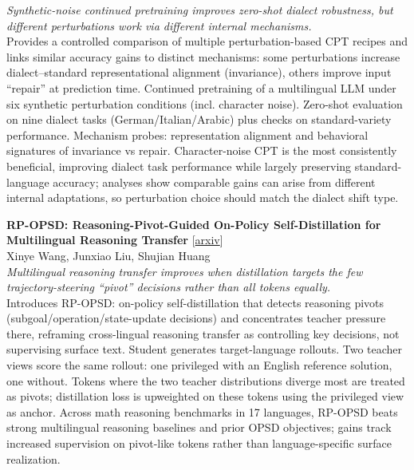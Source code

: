 \documentclass[12pt,letterpaper]{article}
\begin{document}
{\small\textit{Synthetic-noise continued pretraining improves zero-shot dialect robustness, but different perturbations work via different internal mechanisms.}}\\[1pt]
{\footnotesize Provides a controlled comparison of multiple perturbation-based CPT recipes and links similar accuracy gains to distinct mechanisms: some perturbations increase dialect--standard representational alignment (invariance), others improve input ``repair'' at prediction time. Continued pretraining of a multilingual LLM under six synthetic perturbation conditions (incl. character noise). Zero-shot evaluation on nine dialect tasks (German/Italian/Arabic) plus checks on standard-variety performance. Mechanism probes: representation alignment and behavioral signatures of invariance vs repair. Character-noise CPT is the most consistently beneficial, improving dialect task performance while largely preserving standard-language accuracy; analyses show comparable gains can arise from different internal adaptations, so perturbation choice should match the dialect shift type.}

\medskip

{\small\textbf{RP-OPSD: Reasoning-Pivot-Guided On-Policy Self-Distillation for Multilingual Reasoning Transfer}} {\scriptsize[\href{https://arxiv.org/abs/2608.06347}{arxiv}]}\\
{\scriptsize Xinye Wang, Junxiao Liu, Shujian Huang}\\

{\small\textit{Multilingual reasoning transfer improves when distillation targets the few trajectory-steering ``pivot'' decisions rather than all tokens equally.}}\\[1pt]
{\footnotesize Introduces RP-OPSD: on-policy self-distillation that detects reasoning pivots (subgoal/operation/state-update decisions) and concentrates teacher pressure there, reframing cross-lingual reasoning transfer as controlling key decisions, not supervising surface text. Student generates target-language rollouts. Two teacher views score the same rollout: one privileged with an English reference solution, one without. Tokens where the two teacher distributions diverge most are treated as pivots; distillation loss is upweighted on these tokens using the privileged view as anchor. Across math reasoning benchmarks in 17 languages, RP-OPSD beats strong multilingual reasoning baselines and prior OPSD objectives; gains track increased supervision on pivot-like tokens rather than language-specific surface realization.}
\end{document}

